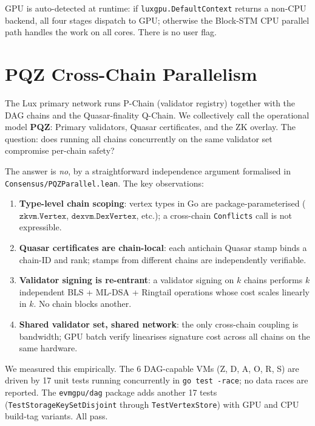 \documentclass[11pt]{article}
\theoremstyle{definition}
\begin{document}
GPU is auto-detected at runtime: if \texttt{luxgpu.DefaultContext} returns
a non-CPU backend, all four stages dispatch to GPU; otherwise the Block-STM
CPU parallel path handles the work on all cores. There is no user flag.

\section{PQZ Cross-Chain Parallelism}
\label{sec:pqz}

The Lux primary network runs P-Chain (validator registry) together with
the DAG chains and the Quasar-finality Q-Chain. We collectively call the
operational model \textbf{PQZ}: Primary validators, Quasar certificates,
and the ZK overlay. The question: does running all chains concurrently on
the same validator set compromise per-chain safety?

The answer is \emph{no}, by a straightforward independence argument
formalised in \texttt{Consensus/PQZParallel.lean}. The key observations:

\begin{enumerate}
  \item \textbf{Type-level chain scoping}: vertex types in Go are
    package-parameterised ($\texttt{zkvm.Vertex}$, $\texttt{dexvm.DexVertex}$,
    etc.); a cross-chain \texttt{Conflicts} call is not expressible.
  \item \textbf{Quasar certificates are chain-local}: each antichain
    Quasar stamp binds a chain-ID and rank; stamps from different chains
    are independently verifiable.
  \item \textbf{Validator signing is re-entrant}: a validator signing on
    $k$ chains performs $k$ independent BLS + ML-DSA + Ringtail operations
    whose cost scales linearly in $k$. No chain blocks another.
  \item \textbf{Shared validator set, shared network}: the only cross-chain
    coupling is bandwidth; GPU batch verify linearises signature cost
    across all chains on the same hardware.
\end{enumerate}

We measured this empirically. The 6 DAG-capable VMs (Z, D, A, O, R, S) are
driven by 17 unit tests running concurrently in \texttt{go test -race}; no
data races are reported. The \texttt{evmgpu/dag} package adds another 17
tests (\texttt{TestStorageKeySetDisjoint} through \texttt{TestVertexStore})
with GPU and CPU build-tag variants. All pass.
\end{document}
